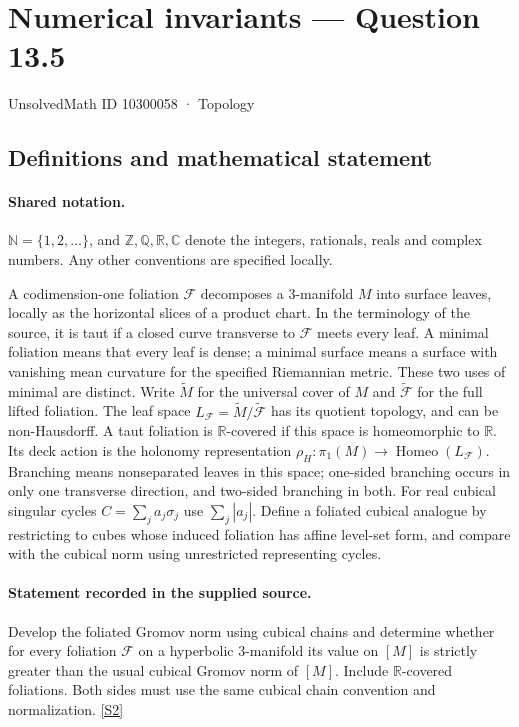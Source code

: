 \documentclass[11pt]{article}
\newcommand{\sref}[2]{\hyperlink{source:#1:#2}{[S#2]}}
\begin{document}
\setcounter{section}{10300057}
\section{Numerical invariants — Question 13.5}\label{10300058}
{\small\sffamily UnsolvedMath ID 10300058 · Topology}
\subsection{Definitions and mathematical statement}

\paragraph{Shared notation.}$\mathbb N=\{1,2,\ldots\}$, and $\mathbb Z,\mathbb Q,\mathbb R,\mathbb C$ denote the integers, rationals, reals and complex numbers. Any other conventions are specified locally.


A codimension-one foliation $\mathcal F$ decomposes a $3$-manifold $M$ into surface leaves, locally as the horizontal slices of a product chart. In the terminology of the source, it is taut if a closed curve transverse to $\mathcal F$ meets every leaf. A minimal foliation means that every leaf is dense; a minimal surface means a surface with vanishing mean curvature for the specified Riemannian metric. These two uses of minimal are distinct. Write $\widetilde M$ for the universal cover of $M$ and $\widetilde{\mathcal F}$ for the full lifted foliation. The leaf space $L_{\mathcal F}=\widetilde M/\widetilde{\mathcal F}$ has its quotient topology, and can be non-Hausdorff. A taut foliation is $\mathbb R$-covered if this space is homeomorphic to $\mathbb R$. Its deck action is the holonomy representation $\rho_H:\pi_1(M)\longrightarrow\operatorname{Homeo}(L_{\mathcal F})$. Branching means nonseparated leaves in this space; one-sided branching occurs in only one transverse direction, and two-sided branching in both. For real cubical singular cycles $C=\sum_j a_j\sigma_j$ use $\sum_j|a_j|$. Define a foliated cubical analogue by restricting to cubes whose induced foliation has affine level-set form, and compare with the cubical norm using unrestricted representing cycles.
\paragraph{Statement recorded in the supplied source.}
Develop the foliated Gromov norm using cubical chains and determine whether for every foliation $\mathcal F$ on a hyperbolic $3$-manifold its value on $[M]$ is strictly greater than the usual cubical Gromov norm of $[M]$. Include $\mathbb R$-covered foliations. Both sides must use the same cubical chain convention and normalization. \sref{10300058}{2}
\end{document}
